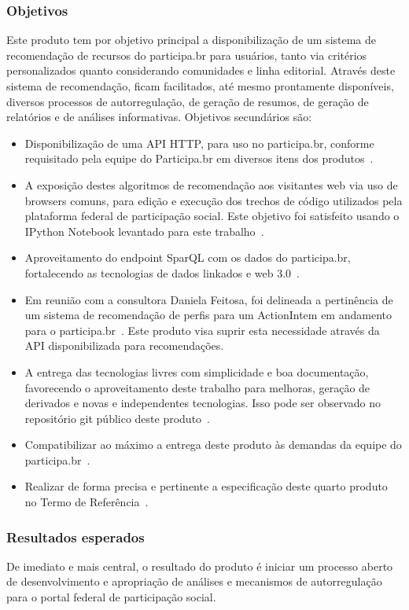 \documentclass[12pt]{article}
\begin{document}
\subsubsection{Objetivos}
Este produto tem por objetivo principal a disponibilização de um sistema de recomendação de recursos do participa.br para usuários, tanto via critérios personalizados quanto considerando comunidades e linha editorial. Através deste sistema de recomendação, ficam facilitados, até mesmo prontamente disponíveis, diversos processos de autorregulação, de geração de resumos, de geração de relatórios e de análises informativas. Objetivos secundários são:
\begin{itemize}
    \item Disponibilização de uma API HTTP, para uso no participa.br, conforme requisitado pela equipe do Participa.br em diversos itens dos produtos~\cite{prodExtra}.
    \item A exposição destes algoritmos de recomendação aos visitantes web via uso de browsers comuns, para edição e execução dos trechos de código utilizados pela plataforma federal de participação social. Este objetivo foi satisfeito usando o IPython Notebook levantado para este trabalho~\cite{iNotebook}.
    \item Aproveitamento do endpoint SparQL com os dados do participa.br, fortalecendo as tecnologias de dados linkados e web 3.0~\cite{endpoint}.
    \item Em reunião com a consultora Daniela Feitosa, foi delineada a pertinência de um sistema de recomendação de perfis para um ActionIntem em andamento para o participa.br~\cite{actionItem}. Este produto visa suprir esta necessidade através da API disponibilizada para recomendações.
    \item A entrega das tecnologias livres com simplicidade e boa documentação, favorecendo o aproveitamento deste trabalho para melhoras, geração de derivados e novas e independentes tecnologias. Isso pode ser observado no repositório git público deste produto~\cite{repoProd4}.
    \item Compatibilizar ao máximo a entrega deste produto às demandas da equipe do participa.br~\cite{prodExtra}.
    \item Realizar de forma precisa e pertinente a especificação deste quarto produto no Termo de Referência~\cite{termoReferencia}.
\end{itemize}

\subsubsection{Resultados esperados}
De imediato e mais central, o resultado do produto é iniciar um processo aberto de desenvolvimento e apropriação de análises e mecanismos de autorregulação para o portal federal de participação social.
\end{document}
